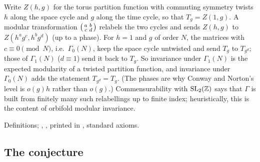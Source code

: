 \begin{physics}
Write $Z(h,g)$ for the torus partition function with commuting symmetry twists $h$ along the space cycle and $g$
along the time cycle, so that $T_g=Z(1,g)$.  A modular transformation $\left(\begin{smallmatrix}a&b\\c&d\end{smallmatrix}\right)$ relabels the two cycles
and sends $Z(h,g)$ to $Z(h^ag^c,h^bg^d)$ (up to a phase).  For $h=1$ and $g$ of order $N$, the matrices with
$c\equiv0\pmod N$, i.e.\ $\Gamma_0(N)$, keep the space cycle untwisted and send $T_g$ to $T_{g^d}$; those of
$\Gamma_1(N)$ ($d\equiv1$) send it back to $T_g$.  So invariance under $\Gamma_1(N)$ is the expected modularity of a
twisted partition function, and invariance under $\Gamma_0(N)$ adds the statement $T_{g^d}=T_g$.  (The phases are why
Conway and Norton's level is $o(g)h$ rather than $o(g)$.)  Commensurability with $\mathrm{SL}_2(\mathbb{Z})$ says that $\Gamma$ is
built from finitely many such relabellings up to finite index; heuristically, this is the content of orbifold
modular invariance.
\end{physics}
\begin{status}
Definitions; , ,  printed in
, standard axioms.
\end{status}

\subsection{The conjecture}

